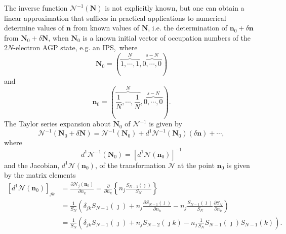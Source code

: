 \documentclass[aps,preprint]{revtex4}%
\begin{document}
The inverse function $\mathcal{N}^{-1}\left(  \mathbf{N}\right)  $ is not
explicitly known, but one can obtain a linear approximation that suffices in
practical applications to numerical determine values of $\mathbf{n}$ from
known values of $\mathbf{N}$, i.e. the determination of $\mathbf{n}_{0}%
+\delta\mathbf{n}$ from $\mathbf{N}_{0}+\delta\mathbf{N}$, when $\mathbf{N}%
_{0}$ is a known initial vector of occupation numbers of the $2N$-electron AGP
state, e.g. an IPS,\ where
\begin{equation}
\mathbf{N}_{0}=\left(  \overset{N}{\overbrace{1,\cdots,1}},\overset
{s-N}{\overbrace{0,\cdots,0}}\right)
\end{equation}
and
\begin{equation}
\mathbf{n}_{0}=\left(  \overset{N}{\overbrace{\frac{1}{N},\cdots,\frac{1}{N}}%
},\overset{s-N}{\overbrace{0,\cdots,0}}\right)  .
\end{equation}
The Taylor series expansion about $\mathbf{N}_{0}$ of $\mathcal{N}^{-1}$ is
given by%
\begin{equation}
\mathcal{N}^{-1}\left(  \mathbf{N}_{0}+\delta\mathbf{N}\right)  =\mathcal{N}%
^{-1}\left(  \mathbf{N}_{0}\right)  +d^{1}\mathcal{N}^{-1}\left(
\mathbf{N}_{0}\right)  \left(  \delta\mathbf{n}\right)  +\cdots,
\end{equation}
where
\begin{equation}
d^{1}\mathcal{N}^{-1}\left(  \mathbf{N}_{0}\right)  =\left[  d^{1}%
\mathcal{N}\left(  \mathbf{n}_{0}\right)  \right]  ^{-1}%
\end{equation}
and the Jacobian, $d^{1}\mathcal{N}\left(  \mathbf{n}_{0}\right)  $, of the
transformation $\mathcal{N}$ at the point $\mathbf{n}_{0}$ is given by the
matrix elements
\begin{align}
\left[  d^{1}\mathcal{N}\left(  \mathbf{n}_{0}\right)  \right]  _{jk} &
=\frac{\partial\mathcal{N}_{j}\left(  \mathbf{n}_{0}\right)  }{\partial n_{k}%
}=\frac{\partial}{\partial n_{k}}\left\{  n_{j}\frac{S_{N-1}\left(
\jmath\right)  }{S_{N}}\right\}  \nonumber\\
&  =\frac{1}{S_{N}}\left(  \delta_{jk}S_{N-1}\left(  \jmath\right)
+n_{j}\frac{\partial S_{N-1}\left(  \jmath\right)  }{\partial n_{k}}%
-n_{j}\frac{S_{N-1}\left(  \jmath\right)  }{S_{N}}\frac{\partial S_{N}%
}{\partial n_{k}}\right)  \nonumber\\
&  =\frac{1}{S_{N}}\left(  \delta_{jk}S_{N-1}\left(  \jmath\right)
+n_{j}S_{N-2}\left(  \jmath k\right)  -n_{j}\frac{1}{S_{N}}S_{N-1}\left(
\jmath\right)  S_{N-1}\left(  k\right)  \right)  .
\end{align}
\end{document}

